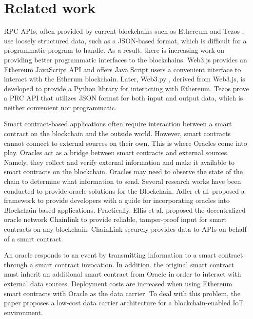 \documentclass[a4paper,USenglish,american,cleveref, autoref, thm-restate]{oasics-v2021}
\begin{document}
\section{Related work}
\label{sec:related-work}
RPC APIs, often provided by current blockchains such as Ethereum \cite{eth-whitepaper} and Tezos \cite{tezos-whitepaper}, use loosely structured data, such as a JSON-based format, which is difficult for a programmatic program to handle. As a result, there is increasing work on providing better programmatic interfaces to the blockchains. Web3.js \cite{web3.js} provides an Ethereum JavaScript API and offers Java Script users a convenient interface to interact with the Etherum blockchain. Later, Web3.py \cite{web3.py}, derived from Web3.js, is developed to provide a Python library for interacting with Ethereum. Tezos prove a PRC API that utilizes JSON format for both input and output data, which is neither convenient nor programmatic.

Smart contract-based applications often require interaction between a smart contract on the blockchain and the outside world. However, smart contracts cannot connect to external sources on their own. This is where Oracles \cite{oracle-patterns,call-action-oracle,oracles-study} come into play. Oracles act as a bridge between smart contracts and external sources. Namely, they collect and verify external information and make it available to smart contracts on the blockchain. Oracles may need to observe the state of the chain to determine what information to send. Several research works have been conducted to provide oracle solutions for the Blockchain. Adler et al.\cite{blockchain-oracles} proposed a framework to provide developers with a guide for incorporating oracles into Blockchain-based applications. Practically, Ellis et al. \cite{chainlink-whitepaper} proposed the decentralized oracle network Chainlink to provide reliable, tamper-proof input for smart contracts on any blockchain. ChainLink securely provides data to APIs on behalf of a smart contract.

An oracle responds to an event by 
transmitting information to a smart contract through a smart contract invocation. In addition. the original smart contract must inherit an additional smart contract from Oracle in order to interact with external data sources. Deployment costs are increased when using Ethereum smart contracts with Oracle as the data carrier. To deal with this problem, the paper \cite{LIU2019590} proposes a low-cost data carrier architecture for a blockchain-enabled IoT environment.
\end{document}
